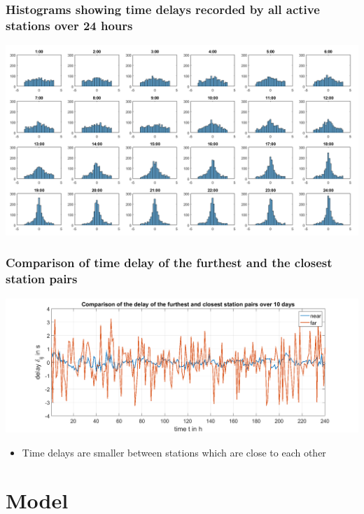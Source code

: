 \documentclass{beamer}
\begin{document}
\begin{frame}
\frametitle{Histograms showing time delays recorded by all active stations over 24 hours}
\includegraphics[width=\textwidth]{hourlydelaydistributionoverallstationsforoneday.png}
\end{frame}

\begin{frame}
\frametitle{Comparison of time delay of the furthest and the closest station pairs}
\includegraphics[width=\textwidth]{Comparisondelayoverrandomdayoffarestandclosestlinks_presentation.png}

\begin{itemize}
\item Time delays are smaller between stations which are close to each other
\end{itemize}
\end{frame}

\section{Model}
\end{document}
